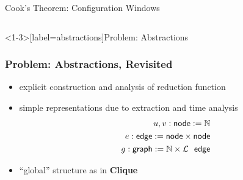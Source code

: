 \documentclass[11pt,usenames,dvipsnames,
  hyperref={pdfencoding=auto,psdextra}]{beamer}
\newcommand{\colorHOne}{\color{red}}
\begin{document}
\begin{frame}{Cook's Theorem: Configuration Windows}
\begin{columns}
\begin{column}{0.3\textwidth}
\begin{center}
{
        }
      \end{center}
    \end{column}
  \end{columns}
\end{frame}

\begin{frame}<1-3>[label=abstractions]{Problem: Abstractions}
  \frametitle<4>{Problem: Abstractions, Revisited}
  \begin{itemize}
    \item explicit construction and analysis of reduction function 
    \item<2-> simple representations due to extraction and time analysis
      \begin{align*}
        u,v : \textsf{node} := \mathbb{N} \\
        e : \textsf{edge} := \textsf{node} \times \textsf{node}\\
        g : \textsf{graph} := \mathbb{N} \times \mathcal{L}~~\textsf{edge} 
      \end{align*}
    \item<3-> {\only<4>{\colorHOne} {``global'' structure as in \textbf{Clique}}}
  \end{itemize}
\end{frame}
\end{document}
